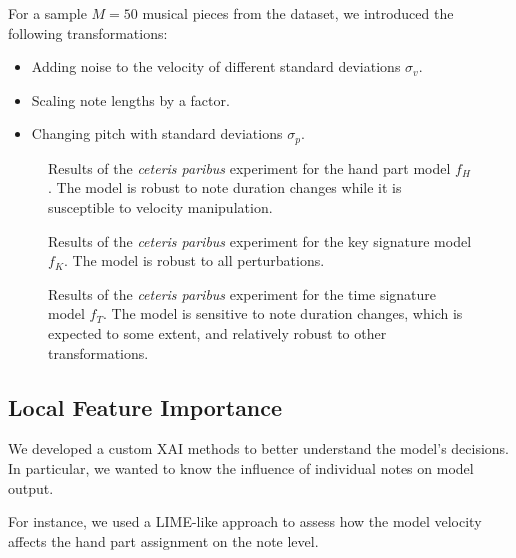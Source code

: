 \documentclass[a4paper, 9pt]{beamer}
\begin{document}
\begin{frame}
For a sample $M = 50$ musical pieces from the dataset, we introduced the following transformations:\pause \begin{itemize}
	\item Adding noise to the velocity of different standard deviations $\sigma_v$.\pause
	\item Scaling note lengths by a factor.\pause
	\item Changing pitch with standard deviations $\sigma_p$.
\end{itemize}
\end{frame}

\begin{frame}
\begin{figure}[ht!]
\centering

\caption{Results of the \emph{ceteris paribus} experiment for the hand part model $f_H$. The model is robust to note duration changes while it is susceptible to velocity manipulation.}
\end{figure}
\end{frame}

\begin{frame}
\begin{figure}[ht!]
\centering

\caption{Results of the \emph{ceteris paribus} experiment for the key signature model $f_K$. The model is robust to all perturbations.}
\end{figure}
\end{frame}

\begin{frame}
\begin{figure}[ht!]
\centering

\caption{Results of the \emph{ceteris paribus} experiment for the time signature model $f_T$. The model is sensitive to note duration changes, which is expected to some extent, and relatively robust to other transformations.}
\end{figure}
\end{frame}

\subsection{Local Feature Importance}

\begin{frame}
We developed a custom XAI methods to better understand the model's decisions. In particular, we wanted to know the influence of individual notes on model output.\pause

For instance, we used a LIME-like approach to assess how the model velocity affects the hand part assignment on the note level.
\end{frame}
\end{document}
